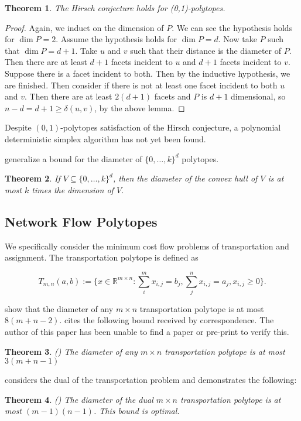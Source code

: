 \documentclass[11pt,a4paper]{article}
\newtheorem{thm}{Theorem}[section]
\theoremstyle{definition}
\begin{document}
\begin{thm}
	The Hirsch conjecture holds for (0,1)-polytopes.
\end{thm}
\begin{proof}
Again, we induct on the dimension of $P$. We can see the hypothesis holds for $\dim P=2$. Assume the hypothesis holds for $\dim P=d$. Now take $P$ such that $\dim P = d+1$. Take $u$ and $v$ such that their distance is the diameter of $P$. Then there are at least $d+1$ facets incident to $u$ and $d+1$ facets incident to $v$. Suppose there is a facet incident to both. Then by the inductive hypothesis, we are finished. Then consider if there is not at least one facet incident to both $u$ and $v$. Then there are at least $2(d+1)$ facets and $P$ is $d+1$ dimensional, so $n-d=d+1\ge \delta(u,v)$, by the above lemma.
\end{proof}
Despite $(0,1)$-polytopes satisfaction of the Hirsch conjecture, a polynomial deterministic simplex algorithm has not yet been found.

\citet{klein92} generalize a bound for the diameter of $\{0,\ldots,k\}^d$ polytopes.
\begin{thm}
	If $V\subseteq \{0,\ldots,k\}^d$, then the diameter of the convex hull of $V$ is at most $k$ times the dimension of $V$.
\end{thm}

\subsection{Network Flow Polytopes}

We specifically consider the minimum cost flow problems of transportation and assignment. The transportation polytope is defined as

$$T_{m,n}(a,b):=\{x\in\mathbb{R}^{m\times n}:\sum_i^m x_{i,j}=b_j, \sum_j^n x_{i,j}=a_j, x_{i,j}\ge 0\}.$$

\citet{bright06} show that the diameter of any $m\times n$ transportation polytope is at most $8(m+n-2)$. \citet{kim09} cites the following bound received by correspondence. The author of this paper has been unable to find a paper or pre-print to verify this.

\begin{thm}
\rm{(\citet{hurk07})} The diameter of any $m\times n$ transportation polytope is at most $3(m+n-1)$
\end{thm}

\citet{bal84} considers the dual of the transportation problem and demonstrates the following:
\begin{thm}{\rm (\citet{bal84})} The diameter of the dual $m\times n$ transportation polytope is at most $(m-1)(n-1)$. This bound is optimal.
\end{thm}
\end{document}
